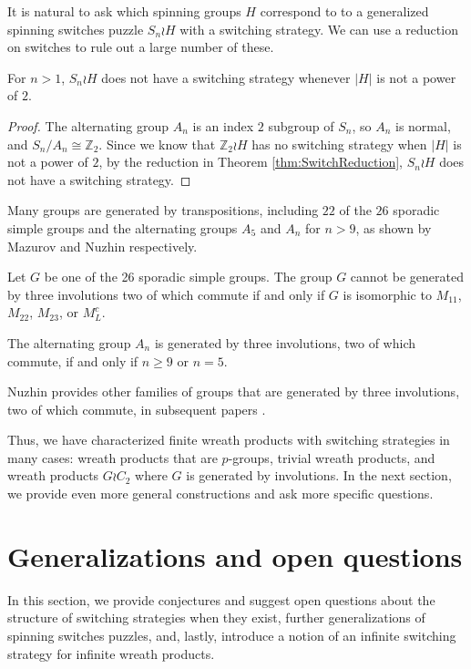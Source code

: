 It is natural to ask which
spinning groups $H$ correspond to to a generalized spinning switches puzzle
$S_n \wr H$ with a switching strategy.
We can use a reduction on switches to rule out a large number of these.
\begin{proposition}
  For $n > 1$, $S_n \wr H$ does not have a switching strategy whenever
  $|H|$ is not a power of $2$.
\end{proposition}
\begin{proof}
  The alternating group $A_n$ is an index $2$ subgroup of $S_n$, so $A_n$ is
  normal, and $S_n/A_n \cong \mathbb Z_2$.
  Since we know that $\mathbb Z_2 \wr H$ has no switching strategy when
  $|H|$ is not a power of $2$,
  by the reduction in Theorem \ref{thm:SwitchReduction}, $S_n \wr H$ does
  not have a switching strategy.
\end{proof}

Many groups are generated by transpositions, including $22$ of the $26$
sporadic simple groups and the alternating groups $A_5$ and $A_n$ for $n > 9$,
as shown by Mazurov and Nuzhin respectively.
\begin{theorem}\cite{Mazurov2003}
  Let $G$ be one of the 26 sporadic simple groups.
  The group $G$ cannot be generated by three involutions two of which commute
  if and only if $G$ is isomorphic to $M_{11}$, $M_{22}$, $M_{23}$, or $M^c_L$.
\end{theorem}
\begin{theorem}\cite{Nuzhin1992}
  The alternating group $A_n$ is generated by three involutions,
  two of which commute, if and only if $n \geq 9$ or $n = 5$.
\end{theorem}

Nuzhin provides other families of groups that are generated by three
involutions, two of which commute, in subsequent papers
\cite{Nuzhin0,Nuzhin1,Nuzhin2}.

Thus, we have characterized finite wreath products with switching strategies
in many cases:
wreath products that are $p$-groups,
trivial wreath products, and
wreath products $G \wr C_2$ where $G$ is generated by involutions.
In the next section, we provide even more general constructions and ask
more specific questions.

%
%
\section{Generalizations and open questions}
\label{sec:OpenQuestions}
In this section, we provide conjectures and suggest open questions about
the structure of switching strategies when they exist,
further generalizations of spinning switches puzzles,
and, lastly, introduce a notion of an infinite switching strategy for infinite
wreath products.

